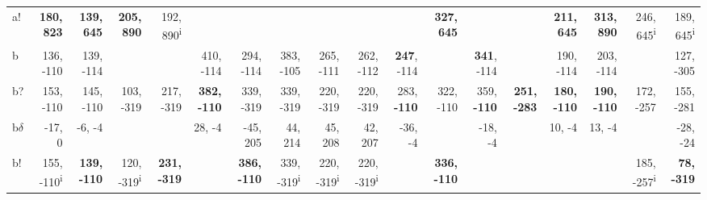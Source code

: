\begin{table}[p]
{\begin{tabular}{lrrrrrrrrrrrrrrrrr}
a! & \textbf{180, 823} & \textbf{139, 645} & \textbf{205, 890} & 192, 890\textsuperscript{i} &  &  &  &  &  &  & \textbf{327, 645} &  &  & \textbf{211, 645} & \textbf{313, 890} & 246, 645\textsuperscript{i} & 189, 645\textsuperscript{i} \\
b & 136, -110 & 139, -114 &  &  & 410, -114 & 294, -114 & 383, -105 & 265, -111 & 262, -112 & \textbf{247}, -114 &  & \textbf{341}, -114 &  & 190, -114 & 203, -114 &  & 127, -305 \\
b? & 153, -110 & 145, -110 & 103, -319 & 217, -319 & \textbf{382, -110} & 339, -319 & 339, -319 & 220, -319 & 220, -319 & 283, \textbf{-110} & 322, -110 & 359, \textbf{-110} & \textbf{251, -283} & \textbf{180, -110} & \textbf{190, -110} & 172, -257 & 155, -281 \\
b$\delta$ & -17, 0 & -6, -4 &  &  & 28, -4 & -45, 205 & 44, 214 & 45, 208 & 42, 207 & -36, -4 &  & -18, -4 &  & 10, -4 & 13, -4 &  & -28, -24 \\
b! & 155, -110\textsuperscript{i} & \textbf{139, -110} & 120, -319\textsuperscript{i} & \textbf{231, -319} &  & \textbf{386, -110} & 339, -319\textsuperscript{i} & 220, -319\textsuperscript{i} & 220, -319\textsuperscript{i} &  & \textbf{336, -110} &  &  &  &  & 185, -257\textsuperscript{i} & \textbf{78, -319} \\

\end{tabular}
}
\end{table}
\clearpage


